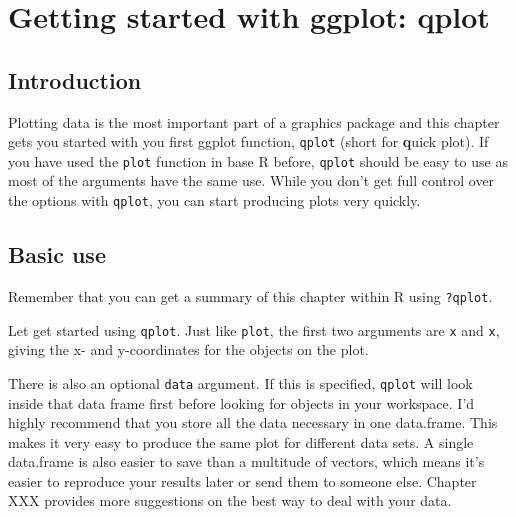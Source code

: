 


\dominitoc \faketableofcontents

\chapter{Getting started with ggplot: qplot}


\section{Introduction}

Plotting data is the most important part of a graphics package and this chapter gets you started with you first ggplot function, {\tt qplot} (short for {\bf q}uick plot).  If you have used the {\tt plot} function in base R before, {\tt qplot} should be easy to use as most of the arguments have the same use.  While you don't get full control over the options with {\tt qplot}, you can start producing plots very quickly. 

\section{Basic use}\label{sec:basic_use}

Remember that you can get a summary of this chapter within R using {\tt ?qplot}.

Let get started using {\tt qplot}.  Just like {\tt plot}, the first two arguments are {\tt x} and {\tt x}, giving the x- and y-coordinates for the objects on the plot.  

There is also an optional {\tt data} argument.  If this is specified, {\tt qplot} will look inside that data frame first before looking for objects in your workspace.  I'd highly recommend that you store all the data necessary in one data.frame.  This makes it very easy to produce the same plot for different data sets.  A single data.frame is also easier to save than a multitude of vectors, which means it's easier to reproduce your results later or send them to someone else.  Chapter XXX provides more suggestions on the best way to deal with your data.  

